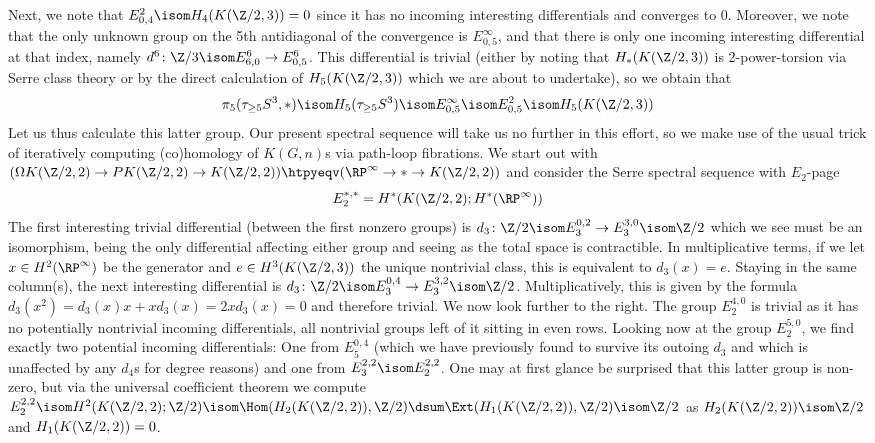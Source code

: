 \begin{solution}
	Next, we note that $E^2_{0, 4} \isom H_4(K(\Zn{2}, 3)) = 0$ since it has no incoming interesting differentials and converges to 0.
	Moreover, we note that the only unknown group on the 5th antidiagonal of the convergence is $E^\infty_{0, 5}$, and that there is only one incoming interesting differential at that index, namely $d^6\colon \Zn{3} \isom E^6_{6, 0} \to E^6_{0, 5}$.
	This differential is trivial (either by noting that $H_*(K(\Zn{2}, 3))$ is 2-power-torsion via Serre class theory or by the direct calculation of $H_5(K(\Zn{2}, 3))$ which we are about to undertake), so we obtain that 
	\begin{equation*}
		\pi_5(\tau_{\geq 5} S^3, *) \isom H_5(\tau_{\geq 5} S^3) \isom E^\infty_{0, 5} \isom E^2_{0, 5} \isom H_5(K(\Zn{2}, 3))
	\end{equation*}
	Let us thus calculate this latter group.
	Our present spectral sequence will take us no further in this effort, so we make use of the usual trick of iteratively computing (co)homology of $K(G, n)$s via path-loop fibrations.
	We start out with $(\Omega K(\Zn{2}, 2) \to P K(\Zn{2}, 2) \to K(\Zn{2}, 2)) \htpyeqv (\RP^\infty \to * \to K(\Zn{2}, 2))$ and consider the Serre spectral sequence with $E_2$-page
	\begin{equation*}
		E_2^{*, *} = H^*(K(\Zn{2}, 2); H^*(\RP^\infty))
	\end{equation*}
	The first interesting trivial differential (between the first nonzero groups) is $d_3\colon \Zn{2} \isom E_3^{0, 2} \to E_3^{3, 0} \isom \Zn{2}$ which we see must be an isomorphism, being the only differential affecting either group and seeing as the total space is contractible.
	In multiplicative terms, if we let $x \in H^2(\RP^\infty)$ be the generator and $e \in H^3(K(\Zn{2}, 3))$ the unique nontrivial class, this is equivalent to $d_3(x) = e$.
	Staying in the same column(s), the next interesting differential is $d_3\colon \Zn{2} \isom E_3^{0, 4} \to E_3^{3, 2} \isom \Zn{2}$.
	Multiplicatively, this is given by the formula $d_3(x^2) = d_3(x) x + x d_3(x) = 2 x d_3(x) = 0$ and therefore trivial.
	We now look further to the right.
	The group $E_2^{4, 0}$ is trivial as it has no potentially nontrivial incoming differentials, all nontrivial groups left of it sitting in even rows.
	Looking now at the group $E_2^{5, 0}$, we find exactly two potential incoming differentials: One from $E_5^{0, 4}$ (which we have previously found to survive its outoing $d_3$ and which is unaffected by any $d_4$s for degree reasons) and one from $E_3^{2, 2} \isom E_2^{2, 2}$.
	One may at first glance be surprised that this latter group is non-zero, but via the universal coefficient theorem we compute $E_2^{2, 2} \isom H^2(K(\Zn{2}, 2); \Zn{2}) \isom \Hom(H_2(K(\Zn{2}, 2)), \Zn{2}) \dsum \Ext(H_1(K(\Zn{2}, 2)), \Zn{2}) \isom \Zn{2}$ as $H_2(K(\Zn{2}, 2)) \isom \Zn{2}$ and $H_1(K(\Zn{2}, 2)) = 0$.

\end{solution}
